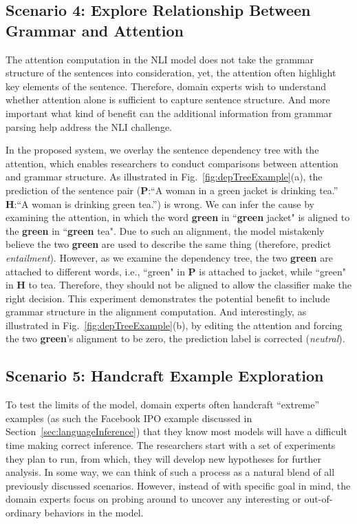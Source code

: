 \subsection{Scenario 4: Explore Relationship Between Grammar and Attention}
The attention computation in the NLI model does not take the grammar structure of the sentences into consideration,
yet, the attention often highlight key elements of the sentence. 
Therefore, domain experts wish to understand whether attention alone is sufficient to capture sentence structure. 
And more important what kind of benefit can the additional information from grammar parsing help address the NLI challenge.

In the proposed system, we overlay the sentence dependency tree with the attention, which enables researchers to conduct comparisons between attention and grammar structure.
As illustrated in Fig.~\ref{fig:depTreeExample}(a), the prediction of the sentence pair (\textbf{P}:``A woman in a green jacket is drinking tea.'' \textbf{H}:``A woman is drinking green tea.'') is wrong. We can infer the cause by examining the attention, in which the word \textbf{green} in ``\textbf{green} jacket" is aligned to the \textbf{green} in ``\textbf{green} tea". Due to such an alignment, the model mistakenly believe the two \textbf{green} are used to describe the same thing (therefore, predict \emph{entailment}).  However, as we examine the dependency tree, the two \textbf{green} are attached to different words, i.e., ``green" in \textbf{P} is attached to jacket, while ``green" in \textbf{H} to tea. Therefore, they should not be aligned to allow the classifier make the right decision.
%
This experiment demonstrates the potential benefit to include grammar structure in the alignment computation. %
%
And interestingly, as illustrated in Fig.~\ref{fig:depTreeExample}(b), by editing the attention and forcing the two \textbf{green}'s alignment to be zero, the prediction label is corrected (\emph{neutral}). 

\subsection{Scenario 5: Handcraft Example Exploration}
To test the limits of the model, domain experts often handcraft ``extreme'' examples (as such the Facebook IPO example discussed in Section~\ref{sec:languageInference}) that they know most models will have a difficult time making correct inference.
%
The researchers start with a set of experiments they plan to run, from which, they will develop new hypotheses for further analysis.
%
In some way, we can think of such a process as a natural blend of all previously discussed scenarios. However, instead of with specific goal in mind, the domain experts focus on probing around to uncover any interesting or out-of-ordinary behaviors in the model.
%


